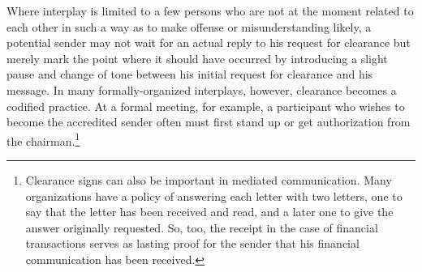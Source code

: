 \documentclass[openany,nobib]{tufte-book}
\begin{document}
Where interplay is limited to a few persons who are not at the moment
related to each other in such a way as to make offense or
misunderstanding likely, a potential sender may not wait for an actual
reply to his request for clearance but merely mark the point where it
should have occurred by introducing a slight pause and change of tone
between his initial request for clearance and his message. In many
formally-organized interplays, however, clearance becomes a codified
practice. At a formal meeting, for example, a participant who wishes to
become the accredited sender often must first stand up or get
authorization from the chairman.\footnote{Clearance signs can also be
  important in mediated communication. Many organizations have a policy
  of answering each letter with two letters, one to say that the letter
  has been received and read, and a later one to give the answer
  originally requested. So, too, the receipt in the case of financial
  transactions serves as lasting proof for the sender that his financial
  communication has been received.}
\end{document}
